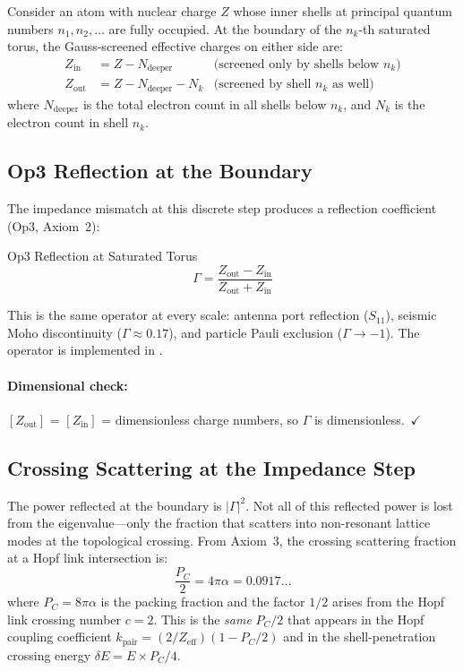 Consider an atom with nuclear charge $Z$ whose inner shells at principal quantum numbers $n_1, n_2, \ldots$ are fully occupied.  At the boundary of the $n_k$-th saturated torus, the Gauss-screened effective charges on either side are:
\begin{align}
    Z_\text{in}  &= Z - N_\text{deeper}  & \text{(screened only by shells below $n_k$)} \\
    Z_\text{out} &= Z - N_\text{deeper} - N_k & \text{(screened by shell $n_k$ as well)}
\end{align}
where $N_\text{deeper}$ is the total electron count in all shells below $n_k$, and $N_k$ is the electron count in shell $n_k$.

\subsection{Op3 Reflection at the Boundary}
\label{sec:sir_op3}

The impedance mismatch at this discrete step produces a reflection coefficient (Op3, Axiom~2):
\begin{resultbox}{Op3 Reflection at Saturated Torus}
\begin{equation}
    \Gamma = \frac{Z_\text{out} - Z_\text{in}}{Z_\text{out} + Z_\text{in}}
    \label{eq:sir_gamma}
\end{equation}
\end{resultbox}
This is the same operator at every scale: antenna port reflection ($S_{11}$), seismic Moho discontinuity ($\Gamma \approx 0.17$), and particle Pauli exclusion ($\Gamma \to -1$\gammaundeclared{}).  The operator is implemented in .

\paragraph{Dimensional check:} $[Z_\text{out}]$ = $[Z_\text{in}]$ = dimensionless charge numbers, so $\Gamma$ is dimensionless.~$\checkmark$

\subsection{Crossing Scattering at the Impedance Step}
\label{sec:sir_crossing}

The power reflected at the boundary is $|\Gamma|^2$.  Not all of this reflected power is lost from the eigenvalue---only the fraction that scatters into non-resonant lattice modes at the topological crossing.  From Axiom~3, the crossing scattering fraction at a Hopf link intersection is:
\begin{equation}
    \frac{P_C}{2} = 4\pi\alpha = 0.0917\ldots
    \label{eq:pc_half}
\end{equation}
where $P_C = 8\pi\alpha$ is the packing fraction and the factor $1/2$ arises from the Hopf link crossing number $c = 2$.  This is the \emph{same} $P_C/2$ that appears in the Hopf coupling coefficient $k_\text{pair} = (2/Z_\text{eff})(1 - P_C/2)$ and in the shell-penetration crossing energy $\delta E = E \times P_C/4$.

